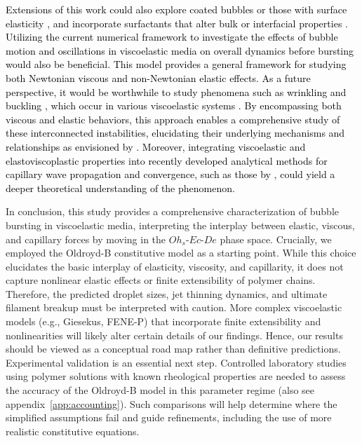 \documentclass{jfm}
\newcommand{\VS}[1]{{\textcolor{black}{#1}}}
\newcommand{\oo}{\color{magenta} \normalfont}
\begin{document}
\VS{Extensions of this work could also explore coated bubbles \citep{dollet2019bubble, yang2023enhanced} or those with surface elasticity \citep{ji2023secondary}, and incorporate surfactants that alter bulk or interfacial properties \citep{constante2021dynamics,lohse2022fundamental,pierre2022influence,pico2024drop}.
Utilizing the current numerical framework to investigate the effects of bubble motion \citep{beris1985creeping,moschopoulos2021concept} and oscillations in viscoelastic media \citep{dollet2019bubble, oratis2024unifying} on overall dynamics before bursting would also be beneficial.
This model provides a general framework for studying both Newtonian viscous and non-Newtonian elastic effects. As a future perspective, it would be worthwhile to study phenomena such as wrinkling \citep{debregeas1998life, oratis2020new, davidovitch2024viscous} and buckling \citep{le2012buckling,timoshenko2012theory}, which occur in various viscoelastic systems \citep{schmalholz1999buckling,lee2024buckling,matoz2020wrinkle}.
By encompassing both viscous and elastic behaviors, this approach enables a comprehensive study of these interconnected instabilities, elucidating their underlying mechanisms and relationships as envisioned by \citet{stokes1845,rayleigh1896theory,taylor1969instability}. Moreover, integrating viscoelastic and elastoviscoplastic \citep{francca2024elasto,ari2024bursting} properties into recently developed analytical methods for capillary wave propagation and convergence, such as those by \citet{kayal2024focusing}, could yield a deeper theoretical understanding of the phenomenon.}

In conclusion, this study provides a comprehensive characterization of bubble bursting in viscoelastic media, interpreting the interplay between elastic, viscous, and capillary forces by moving in the $Oh_s$-$Ec$-$De$ phase space. 
\oo
Crucially, we employed the Oldroyd-B constitutive model as a starting point. While this choice elucidates the basic interplay of elasticity, viscosity, and capillarity, it does not capture nonlinear elastic effects or finite extensibility of polymer chains. Therefore, the predicted droplet sizes, jet thinning dynamics, and ultimate filament breakup must be interpreted with caution. More complex viscoelastic models (e.g., Giesekus, FENE-P) that incorporate finite extensibility and nonlinearities will likely alter certain details of our findings. Hence, our results should be viewed as a conceptual road map rather than definitive predictions. Experimental validation is an essential next step. Controlled laboratory studies using polymer solutions with known rheological properties are needed to assess the accuracy of the Oldroyd-B model in this parameter regime (also see appendix~\ref{app:accounting}). Such comparisons will help determine where the simplified assumptions fail and guide refinements, including the use of more realistic constitutive equations.
\end{document}
